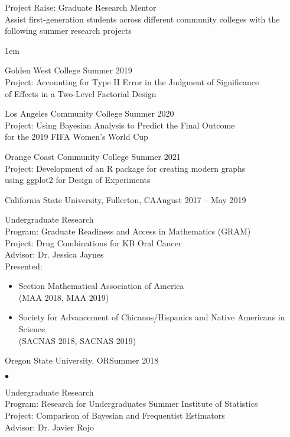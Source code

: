 \documentclass[margin,line]{res}
\newenvironment{list1}{
  \begin{list}{\ding{113}}{
      \setlength{\itemsep}{0in}
      \setlength{\parsep}{0in} \setlength{\parskip}{0in}
      \setlength{\topsep}{0in} \setlength{\partopsep}{0in} 
      \setlength{\leftmargin}{0.20in}}}{\end{list}}
\newenvironment{list2}{
  \begin{list}{$\bullet$}{
      \setlength{\itemsep}{0in}
      \setlength{\parsep}{0in} \setlength{\parskip}{0in}
      \setlength{\topsep}{0in} \setlength{\partopsep}{0in} 
      \setlength{\leftmargin}{0.2in}}}{\end{list}}
\begin{document}
\begin{resume}
{\sc Project Raise: Graduate Research Mentor}\\[5pt]
Assist first-generation students across different community colleges with the
following summer research projects \\[4pt]
\begin{list1}
\itemsep1em
\item[] {\sc Golden West College} \hfill Summer 2019 \\[3pt]
Project: Accounting for Type II Error in the Judgment of Significance \\[3pt]
of Effects 
in a Two-Level Factorial Design
\item[] {\sc Los Angeles Community College} \hfill Summer 2020 \\[3pt]
Project: Using Bayesian Analysis to Predict the Final Outcome  \\[3pt]
for the 2019 
FIFA Women's World Cup
\item[] {\sc Orange Coast Community College} \hfill Summer 2021 \\[3pt]
Project: Development of an R package for creating modern graphs \\[3pt]
using ggplot2 for 
Design of Experiments
\end{list1}


\newpage

{\sc California State University, Fullerton}, CA\hfill{August 2017 -- May 2019}\\
\vspace*{-.15in}
\begin{list1}
\item[] {\sc Undergraduate Research}  \\
\vskip -6pt
Program: Graduate Readiness and Access in Mathematics (GRAM) \\[3pt]
 Project: Drug Combinations for KB Oral Cancer\\[3pt]
 Advisor: Dr. Jessica Jaynes \vspace{0.1cm} \\ 
Presented: 
 \begin{itemize}
 \item Section Mathematical Association of America \\ (MAA 2018, MAA 2019)
 \item Society for Advancement of Chicanos/Hispanics and Native Americans in Science \\ (SACNAS 2018, SACNAS 2019)
 \end{itemize}
\end{list1}
{\sc Oregon State University}, OR\hfill{Summer 2018}\\
\vspace*{-.15in}
\begin{list2}
\item[] {\sc Undergraduate Research}  \\
\vskip -6pt
 Program: Research for Undergraduates Summer Institute of Statistics \\[3pt]
 Project: Comparison of Bayesian and Frequentist Estimators \\[3pt]
Advisor: Dr. Javier Rojo
\end{list2}


\end{resume}
\end{document}
